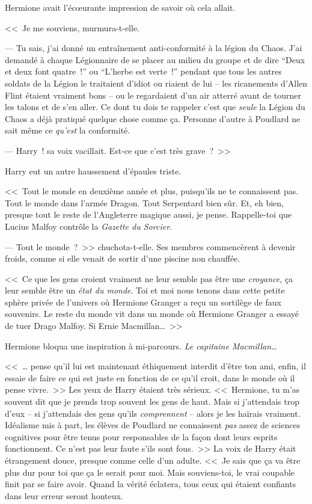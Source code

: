 Hermione avait l'écœurante impression de savoir où cela allait.

<<~Je me souviens, murmura-t-elle.

--- Tu sais, j'ai donné un entraînement anti-conformité à la légion du Chaos. J'ai demandé à chaque Légionnaire de se placer au milieu du groupe et de dire “Deux et deux font quatre~!” ou “L'herbe est verte~!” pendant que tous les autres soldats de la Légion le traitaient d'idiot ou riaient de lui -- les ricanements d'Allen Flint étaient vraiment bons -- ou le regardaient d'un air atterré avant de tourner les talons et de s'en aller. Ce dont tu dois te rappeler c'est que \emph{seule} la Légion du Chaos a déjà pratiqué quelque chose comme ça. Personne d'autre à Poudlard ne sait même ce \emph{qu'est} la conformité.

--- Harry~! sa voix vacillait. Est-ce que c'est très grave~?~>>

Harry eut un autre haussement d'épaules triste.

<<~Tout le monde en deuxième année et plus, puisqu'ils ne te connaissent pas. Tout le monde dans l'armée Dragon. Tout Serpentard bien sûr. Et, eh bien, presque tout le reste de l'Angleterre magique aussi, je pense. Rappelle-toi que Lucius Malfoy contrôle la \emph{Gazette du Sorcier}.

--- Tout le monde~?~>> chuchota-t-elle. Ses membres commencèrent à devenir froids, comme si elle venait de sortir d'une piscine non chauffée.

<<~Ce que les gens croient vraiment ne leur semble pas être une \emph{croyance}, ça leur semble être un \emph{état du monde}. Toi et moi nous tenons dans cette petite sphère privée de l'univers où Hermione Granger a reçu un sortilège de faux souvenirs. Le reste du monde vit dans un monde où Hermione Granger a essayé de tuer Drago Malfoy. Si Ernie Macmillan…~>>

Hermione bloqua une inspiration à mi-parcours. \emph{Le capitaine Macmillan…}

<<~… pense qu'il lui est maintenant éthiquement interdit d'être ton ami, enfin, il essaie de faire ce qui est juste en fonction de ce qu'il croit, dans le monde où il pense vivre.~>> Les yeux de Harry étaient très sérieux. <<~Hermione, tu m'as souvent dit que je prends trop souvent les gens de haut. Mais si j'attendais trop d'eux -- si j'attendais des gens qu'ils \emph{comprennent} -- alors je les haïrais vraiment. Idéalisme mis à part, les élèves de Poudlard ne connaissent \emph{pas} assez de sciences cognitives pour être tenus pour responsables de la façon dont leurs esprits fonctionnent. Ce n'est pas leur faute s'ils sont fous.~>> La voix de Harry était étrangement douce, presque comme celle d'un adulte. <<~Je sais que ça va être plus dur pour toi que ça le serait pour moi. Mais souviens-toi, le vrai coupable finit par se faire avoir. Quand la vérité éclatera, tous ceux qui étaient confiants dans leur erreur seront honteux.

